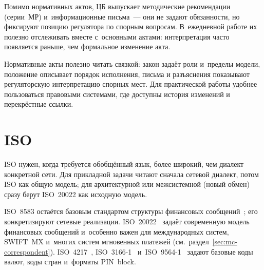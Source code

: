 Помимо нормативных актов, ЦБ выпускает методические рекомендации (серии~МР)
и~информационные письма~--- они не задают обязанности, но фиксируют позицию
регулятора по спорным вопросам. В~ежедневной работе их полезно отслеживать
вместе с~основными актами: интерпретация часто появляется раньше, чем
формальное изменение акта.

Нормативные акты полезно читать связкой: закон задаёт роли и~пределы модели,
положение описывает порядок исполнения, письма и разъяснения показывают
регуляторскую интерпретацию спорных мест. Для практической работы удобнее
пользоваться правовыми системами, где доступны история изменений и перекрёстные
ссылки.

\section*{ISO}\label{sec:ps-iso}

ISO нужен, когда требуется обобщённый язык, более широкий, чем диалект
конкретной сети. Для прикладной задачи читают сначала сетевой диалект, потом
ISO как общую модель; для архитектурной или межсистемной (новый обмен)
сразу берут ISO~20022 как исходную модель.

ISO~8583 остаётся базовым стандартом структуры финансовых
сообщений~\cite{iso-8583-2023}; его конкретизируют сетевые
реализации. ISO~20022~\cite{iso-20022} задаёт современную модель финансовых
сообщений и~особенно важен для международных систем, SWIFT~MX и~многих систем
мгновенных платежей (см.~раздел~\ref{sec:mc-correspondent}).
ISO~4217~\cite{iso-4217}, ISO~3166-1~\cite{iso-3166-1}
и~ISO~9564-1~\cite{iso-9564} задают базовые коды валют, коды стран и~форматы
PIN~block.
